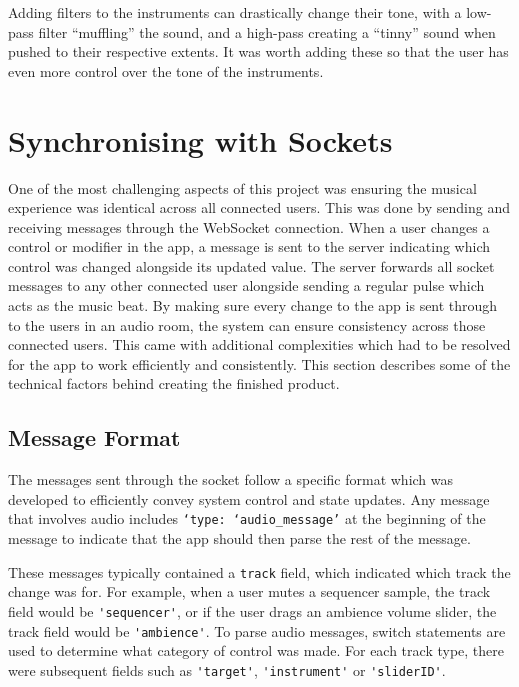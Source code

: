 Adding filters to the instruments can drastically change their tone, with a low-pass filter “muffling” the sound, and a high-pass creating a “tinny” sound when pushed to their respective extents. It was worth adding these so that the user has even more control over the tone of the instruments.

\section{Synchronising with Sockets}
One of the most challenging aspects of this project was ensuring the musical experience was identical across all connected users. This was done by sending and receiving messages through the WebSocket connection. When a user changes a control or modifier in the app, a message is sent to the server indicating which control was changed alongside its updated value. The server forwards all socket messages to any other connected user alongside sending a regular pulse which acts as the music beat.
By making sure every change to the app is sent through to the users in an audio room, the system can ensure consistency across those connected users. This came with additional complexities which had to be resolved for the app to work efficiently and consistently. This section describes some of the technical factors behind creating the finished product.

\subsection{Message Format}
The messages sent through the socket follow a specific format which was developed to efficiently convey system control and state updates. Any message that involves audio includes \verb|‘type: ‘audio_message’| at the beginning of the message to indicate that the app should then parse the rest of the message.

These messages typically contained a \verb|track| field, which indicated which track the change was for. For example, when a user mutes a sequencer sample, the track field would be \verb|'sequencer'|, or if the user drags an ambience volume slider, the track field would be \verb|'ambience'|. To parse audio messages, switch statements are used to determine what category of control was made. For each track type, there were subsequent fields such as \verb|'target'|, \verb|'instrument'| or \verb|'sliderID'|.

